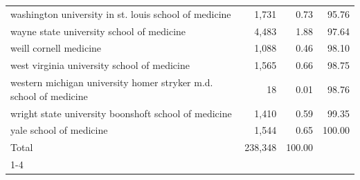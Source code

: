 \begin{table}[!h]
\begin{tabular}{llll}
\multicolumn{1}{l}{\hspace{1em}washington university in st. louis school of medicine} &
  \multicolumn{1}{r}{1,731} &
  \multicolumn{1}{r}{0.73} &
  \multicolumn{1}{r}{95.76} \\
\multicolumn{1}{l}{\hspace{1em}wayne state university school of medicine} &
  \multicolumn{1}{r}{4,483} &
  \multicolumn{1}{r}{1.88} &
  \multicolumn{1}{r}{97.64} \\
\multicolumn{1}{l}{\hspace{1em}weill cornell medicine} &
  \multicolumn{1}{r}{1,088} &
  \multicolumn{1}{r}{0.46} &
  \multicolumn{1}{r}{98.10} \\
\multicolumn{1}{l}{\hspace{1em}west virginia university school of medicine} &
  \multicolumn{1}{r}{1,565} &
  \multicolumn{1}{r}{0.66} &
  \multicolumn{1}{r}{98.75} \\
\multicolumn{1}{l}{\hspace{1em}western michigan university homer stryker m.d. school of medicine} &
  \multicolumn{1}{r}{18} &
  \multicolumn{1}{r}{0.01} &
  \multicolumn{1}{r}{98.76} \\
\multicolumn{1}{l}{\hspace{1em}wright state university boonshoft school of medicine} &
  \multicolumn{1}{r}{1,410} &
  \multicolumn{1}{r}{0.59} &
  \multicolumn{1}{r}{99.35} \\
\multicolumn{1}{l}{\hspace{1em}yale school of medicine} &
  \multicolumn{1}{r}{1,544} &
  \multicolumn{1}{r}{0.65} &
  \multicolumn{1}{r}{100.00} \\
\multicolumn{1}{l}{\hspace{1em}Total} &
  \multicolumn{1}{r}{238,348} &
  \multicolumn{1}{r}{100.00} &
  \multicolumn{1}{r}{} \\
\cline{1-4}
\end{tabular}
\end{table}
